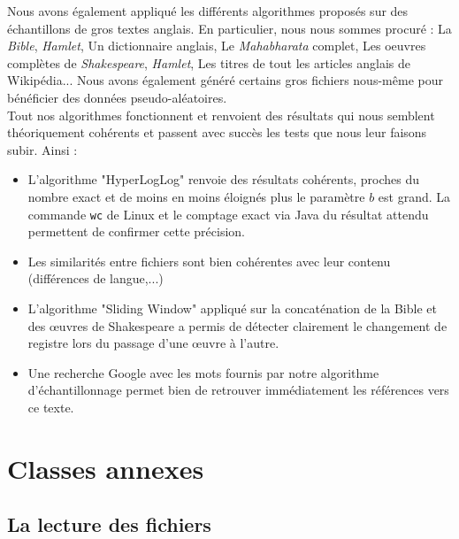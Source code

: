 \documentclass[12pt,a4paper,titlepage]{article}
\newcommand{\class}[1]{\texttt{#1}}
\begin{document}
Nous avons également appliqué les différents algorithmes proposés sur des échantillons de gros textes anglais. En particulier, nous nous sommes procuré : La \textit{Bible}, \textit{Hamlet}, Un dictionnaire anglais, Le \textit{Mahabharata} complet, Les oeuvres complètes de \textit{Shakespeare}, \textit{Hamlet}, Les titres de tout les articles anglais de Wikipédia... Nous avons également généré certains gros fichiers nous-même pour bénéficier des données pseudo-aléatoires.\\

Tout nos algorithmes fonctionnent et renvoient des résultats qui nous semblent théoriquement cohérents et passent avec succès les tests que nous leur faisons subir. Ainsi :
\begin{itemize}
\item L'algorithme "HyperLogLog" renvoie des résultats cohérents, proches du nombre exact et de moins en moins éloignés plus le paramètre $b$ est grand.
La commande \class{wc} de Linux et le comptage exact via Java du résultat attendu permettent de confirmer cette précision.
\item Les similarités entre fichiers sont bien cohérentes avec leur contenu (différences de langue,...)
\item L'algorithme "Sliding Window" appliqué sur la concaténation de la Bible et des œuvres de Shakespeare a permis de détecter clairement le changement de registre lors du passage d'une œuvre à l'autre.
\item Une recherche Google avec les mots fournis par notre algorithme d'échantillonnage permet bien de retrouver immédiatement les références vers ce texte.
\end{itemize}

\section*{Classes annexes}

\subsection*{La lecture des fichiers}
\end{document}
